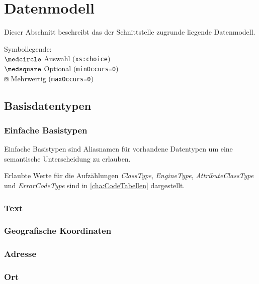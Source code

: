 \chapter{Datenmodell}
\label{cha:Datenmodell}
Dieser Abschnitt beschreibt das der Schnittstelle zugrunde liegende Datenmodell. \medskip

\noindent Symbollegende:\\
$\medcircle$ Auswahl (\verb|xs:choice|)\\
$\medsquare$ Optional (\verb|minOccurs=0|)\\
$\boxbox$ Mehrwertig (\verb|maxOccurs=0|)\\


\section{Basisdatentypen}
\label{sec:Datenmodell:Basisdatentypen}

\subsection*{Einfache Basistypen}
Einfache Basistypen sind Aliasnamen für vorhandene Datentypen um eine semantische Unterscheidung zu erlauben.


Erlaubte Werte für die Aufzählungen \emph{ClassType}, \emph{EngineType}, \emph{AttributeClassType} und \emph{ErrorCodeType} sind in \autoref{cha:CodeTabellen} dargestellt.

\subsection*{Text}



\subsection*{Geografische Koordinaten}



\subsection*{Adresse}



\subsection*{Ort}



